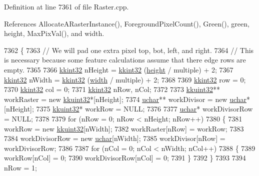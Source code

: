 Definition at line 7361 of file Raster.\+cpp.



References Allocate\+A\+Raster\+Instance(), Foreground\+Pixel\+Count(), Green(), green, height, Max\+Pix\+Val(), and width.


\begin{DoxyCode}
7362 \{
7363   \textcolor{comment}{// We will pad one extra pixel top, bot, left, and right.}
7364   \textcolor{comment}{// This is necessary because some feature calculations assume that there edge rows are empty.}
7365 
7366   \hyperlink{namespace_k_k_b_a8fa4952cc84fda1de4bec1fbdd8d5b1b}{kkint32}  nHeight = \hyperlink{namespace_k_k_b_a8fa4952cc84fda1de4bec1fbdd8d5b1b}{kkint32} (\hyperlink{class_k_k_b_1_1_raster_af39ff189de4fbb6de98392e187efafb7}{height} / multiple) + 2;
7367   \hyperlink{namespace_k_k_b_a8fa4952cc84fda1de4bec1fbdd8d5b1b}{kkint32}  nWidth  = \hyperlink{namespace_k_k_b_a8fa4952cc84fda1de4bec1fbdd8d5b1b}{kkint32} (\hyperlink{class_k_k_b_1_1_raster_ae0bcc103e191c3421d7692dc69ceb554}{width}  / multiple) + 2; 
7368 
7369   \hyperlink{namespace_k_k_b_a8fa4952cc84fda1de4bec1fbdd8d5b1b}{kkint32}  row = 0;
7370   \hyperlink{namespace_k_k_b_a8fa4952cc84fda1de4bec1fbdd8d5b1b}{kkint32}  col = 0;
7371   \hyperlink{namespace_k_k_b_a8fa4952cc84fda1de4bec1fbdd8d5b1b}{kkint32}  nRow, nCol;
7372 
7373   \hyperlink{namespace_k_k_b_af8d832f05c54994a1cce25bd5743e19a}{kkuint32}**  workRaster  = \textcolor{keyword}{new} \hyperlink{namespace_k_k_b_af8d832f05c54994a1cce25bd5743e19a}{kkuint32}*[nHeight];
7374   \hyperlink{namespace_k_k_b_ace9969169bf514f9ee6185186949cdf7}{uchar}**     workDivisor = \textcolor{keyword}{new} \hyperlink{namespace_k_k_b_ace9969169bf514f9ee6185186949cdf7}{uchar}*[nHeight];
7375   \hyperlink{namespace_k_k_b_af8d832f05c54994a1cce25bd5743e19a}{kkuint32}*   workRow     = NULL;
7376 
7377   \hyperlink{namespace_k_k_b_ace9969169bf514f9ee6185186949cdf7}{uchar}*  workDivisorRow = NULL;
7378 
7379   \textcolor{keywordflow}{for}  (nRow = 0;  nRow < nHeight;  nRow++)
7380   \{
7381     workRow = \textcolor{keyword}{new} \hyperlink{namespace_k_k_b_af8d832f05c54994a1cce25bd5743e19a}{kkuint32}[nWidth];
7382     workRaster[nRow] = workRow;
7383 
7384     workDivisorRow = \textcolor{keyword}{new} \hyperlink{namespace_k_k_b_ace9969169bf514f9ee6185186949cdf7}{uchar}[nWidth];
7385     workDivisor[nRow] = workDivisorRow;
7386 
7387     \textcolor{keywordflow}{for}  (nCol = 0;  nCol < nWidth;  nCol++)
7388     \{
7389       workRow[nCol] = 0;
7390       workDivisorRow[nCol] = 0;
7391     \}
7392   \}
7393 
7394   nRow = 1;

\end{DoxyCode}
